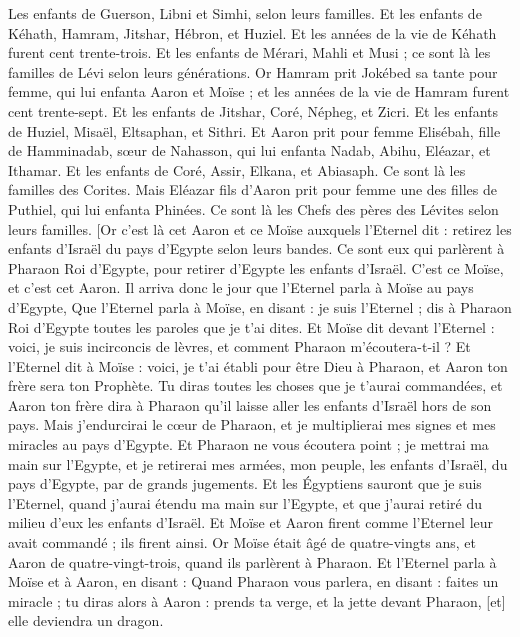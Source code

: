 \begin{multicols}{2}
Les enfants de Guerson, Libni et Simhi, selon leurs familles.
Et les enfants de Kéhath, Hamram, Jitshar, Hébron, et Huziel. Et les années de la vie de Kéhath furent cent trente-trois.
Et les enfants de Mérari, Mahli et Musi ; ce sont là les familles de Lévi selon leurs générations.
Or Hamram prit Jokébed sa tante pour femme, qui lui enfanta Aaron et Moïse ; et les années de la vie de Hamram furent cent trente-sept.
Et les enfants de Jitshar, Coré, Népheg, et Zicri.
Et les enfants de Huziel, Misaël, Eltsaphan, et Sithri.
Et Aaron prit pour femme Elisébah, fille de Hamminadab, sœur de Nahasson, qui lui enfanta Nadab, Abihu, Eléazar, et Ithamar.
Et les enfants de Coré, Assir, Elkana, et Abiasaph. Ce sont là les familles des Corites.
Mais Eléazar fils d'Aaron prit pour femme une des filles de Puthiel, qui lui enfanta Phinées. Ce sont là les Chefs des pères des Lévites selon leurs familles.
[Or c'est là cet Aaron et ce Moïse auxquels l'Eternel dit : retirez les enfants d'Israël du pays d'Egypte selon leurs bandes.
Ce sont eux qui parlèrent à Pharaon Roi d'Egypte, pour retirer d'Egypte les enfants d'Israël. C'est ce Moïse, et c'est cet Aaron.
Il arriva donc le jour que l'Eternel parla à Moïse au pays d'Egypte,
Que l'Eternel parla à Moïse, en disant : je suis l'Eternel ; dis à Pharaon Roi d'Egypte toutes les paroles que je t'ai dites.
Et Moïse dit devant l'Eternel : voici, je suis incirconcis de lèvres, et comment Pharaon m'écoutera-t-il ?
\VerseOne{}Et l'Eternel dit à Moïse : voici, je t'ai établi pour être Dieu à Pharaon, et Aaron ton frère sera ton Prophète.
Tu diras toutes les choses que je t'aurai commandées, et Aaron ton frère dira à Pharaon qu'il laisse aller les enfants d'Israël hors de son pays.
Mais j'endurcirai le cœur de Pharaon, et je multiplierai mes signes et mes miracles au pays d'Egypte.
Et Pharaon ne vous écoutera point ; je mettrai ma main sur l'Egypte, et je retirerai mes armées, mon peuple, les enfants d'Israël, du pays d'Egypte, par de grands jugements.
Et les Égyptiens sauront que je suis l'Eternel, quand j'aurai étendu ma main sur l'Egypte, et que j'aurai retiré du milieu d'eux les enfants d'Israël.
Et Moïse et Aaron firent comme l'Eternel leur avait commandé ; ils firent ainsi.
Or Moïse était âgé de quatre-vingts ans, et Aaron de quatre-vingt-trois, quand ils parlèrent à Pharaon.
Et l'Eternel parla à Moïse et à Aaron, en disant :
Quand Pharaon vous parlera, en disant : faites un miracle ; tu diras alors à Aaron : prends ta verge, et la jette devant Pharaon, [et] elle deviendra un dragon.

\end{multicols}
